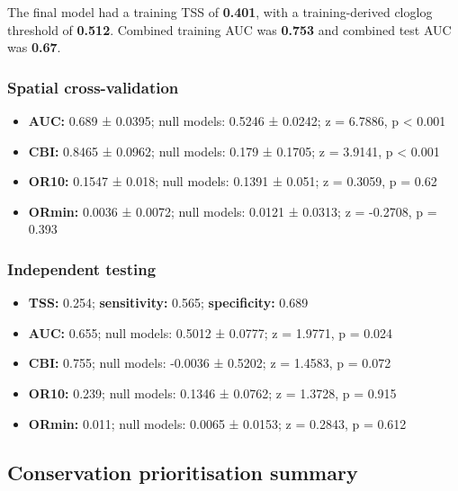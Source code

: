 \documentclass[
  openany]{book}
\providecommand{\tightlist}{%
  \setlength{\itemsep}{0pt}\setlength{\parskip}{0pt}}
\providecommand{\tightlist}{%
  \setlength{\itemsep}{0pt}%
  \setlength{\parskip}{0pt}%
}
\begin{document}
The final model had a training TSS of \textbf{0.401}, with a training-derived cloglog threshold of \textbf{0.512}. Combined training AUC was \textbf{0.753} and combined test AUC was \textbf{0.67}.

\subsubsection*{Spatial cross-validation}\label{spatial-cross-validation-15}

\begin{itemize}
\tightlist
\item
  \textbf{AUC:} 0.689 ± 0.0395; null models: 0.5246 ± 0.0242; z = 6.7886, p \textless{} 0.001
\item
  \textbf{CBI:} 0.8465 ± 0.0962; null models: 0.179 ± 0.1705; z = 3.9141, p \textless{} 0.001
\item
  \textbf{OR10:} 0.1547 ± 0.018; null models: 0.1391 ± 0.051; z = 0.3059, p = 0.62
\item
  \textbf{ORmin:} 0.0036 ± 0.0072; null models: 0.0121 ± 0.0313; z = -0.2708, p = 0.393
\end{itemize}

\subsubsection*{Independent testing}\label{independent-testing-15}

\begin{itemize}
\tightlist
\item
  \textbf{TSS:} 0.254; \textbf{sensitivity:} 0.565; \textbf{specificity:} 0.689
\item
  \textbf{AUC:} 0.655; null models: 0.5012 ± 0.0777; z = 1.9771, p = 0.024
\item
  \textbf{CBI:} 0.755; null models: -0.0036 ± 0.5202; z = 1.4583, p = 0.072
\item
  \textbf{OR10:} 0.239; null models: 0.1346 ± 0.0762; z = 1.3728, p = 0.915
\item
  \textbf{ORmin:} 0.011; null models: 0.0065 ± 0.0153; z = 0.2843, p = 0.612
\end{itemize}

\subsection*{Conservation prioritisation summary}\label{conservation-prioritisation-summary-15}
\end{document}
